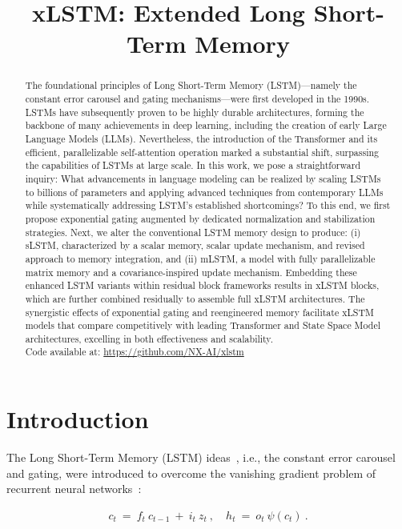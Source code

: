 \title{xLSTM: Extended Long Short-Term Memory}

\begin{abstract}
The foundational principles of Long Short-Term Memory (LSTM)—namely the constant error carousel and gating mechanisms—were first developed in the 1990s. LSTMs have subsequently proven to be highly durable architectures, forming the backbone of many achievements in deep learning, including the creation of early Large Language Models (LLMs). Nevertheless, the introduction of the Transformer and its efficient, parallelizable self-attention operation marked a substantial shift, surpassing the capabilities of LSTMs at large scale. In this work, we pose a straightforward inquiry: What advancements in language modeling can be realized by scaling LSTMs to billions of parameters and applying advanced techniques from contemporary LLMs while systematically addressing LSTM's established shortcomings? To this end, we first propose exponential gating augmented by dedicated normalization and stabilization strategies. Next, we alter the conventional LSTM memory design to produce: (i) sLSTM, characterized by a scalar memory, scalar update mechanism, and revised approach to memory integration, and (ii) mLSTM, a model with fully parallelizable matrix memory and a covariance-inspired update mechanism. Embedding these enhanced LSTM variants within residual block frameworks results in xLSTM blocks, which are further combined residually to assemble full xLSTM architectures. The synergistic effects of exponential gating and reengineered memory facilitate xLSTM models that compare competitively with leading Transformer and State Space Model architectures, excelling in both effectiveness and scalability.\\
Code available at: \url{https://github.com/NX-AI/xlstm}
\end{abstract}

\section{Introduction}
\label{sec:intro}

The Long Short-Term Memory (LSTM) ideas~\citep{Hochreiter:91,Hochreiter:97nips,Hochreiter:97}, i.e., the constant error carousel and gating, were introduced to overcome the vanishing gradient problem of recurrent neural networks~\citep{Hochreiter:91,Hochreiter:00book}:

\begin{align}
\label{eq:lstm_idea}
  c_t \ = \ f_t \ c_{t-1} \ + \ 
          i_t \  z_t \ , \quad  
          h_t \ = \ o_t \ \psi({c_t}) \ . 
\end{align}

